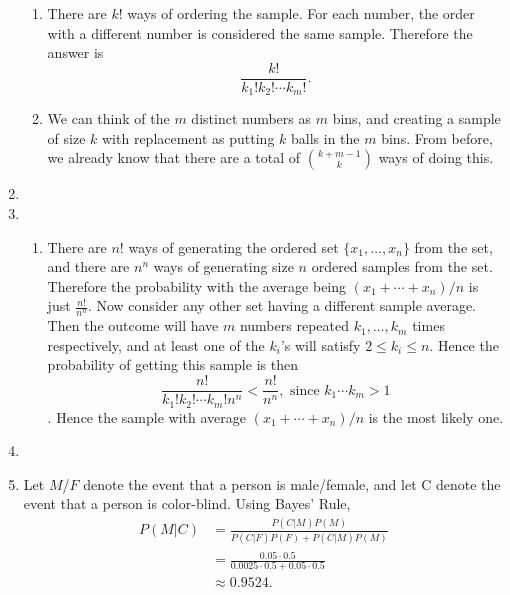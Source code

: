 \documentclass{article}
\begin{document}
\begin{enumerate}
\begin{enumerate}
        \item There are $k!$ ways of ordering the sample. For each number, the order with a 
        different number is considered the same sample. Therefore the answer is 
        \[ \frac{k!}{k_1!k_2!\cdots k_m!}. \]

        \item We can think of the $m$ distinct numbers as $m$ bins, and creating a sample of 
        size $k$ with replacement as putting $k$ balls in the $m$ bins. From before, we 
        already know that there are a total of $\binom{k + m - 1}{k}$ ways of doing this.
    \end{enumerate}

    \item 
    
    \item \begin{enumerate}
        \item There are $n!$ ways of generating the ordered set $\{x_1, ..., x_n\}$ 
        from the set, and there are $n^n$ ways of generating size $n$ ordered samples from 
        the set. Therefore the probability with the average being 
        $(x_1 + \cdots + x_n) / n$ is just $\frac{n!}{n^n}$. Now consider any other set having 
        a different sample average. Then the outcome will have $m$ numbers repeated 
        $k_1, \dots, k_m$ times respectively, and at least one of the $k_i$'s will satisfy 
        $2 \leq k_i \leq n$. Hence the probability of getting this sample is then 
        \[ \frac{n!}{k_1!k_2!\cdots k_m! n^n} < \frac{n!}{n^n}, \text{ since } 
        k_1 \cdots k_m > 1\].
        Hence the sample with average $(x_1 + \cdots + x_n) / n$ is the most likely one.
    \end{enumerate}

    \item 

    \item Let $M$/$F$ denote the event that a person is male/female, and let C denote the event 
    that a person is color-blind. Using Bayes' Rule, 
    \begin{align*}
        P(M|C)
        &= \frac{P(C|M)P(M)}{P(C|F)P(F) + P(C|M)P(M)} \\
        &= \frac{0.05 \cdot 0.5}{0.0025 \cdot 0.5 + 0.05 \cdot 0.5} \\
        &\approx 0.9524. 
    \end{align*}


\end{enumerate}
\end{document}
